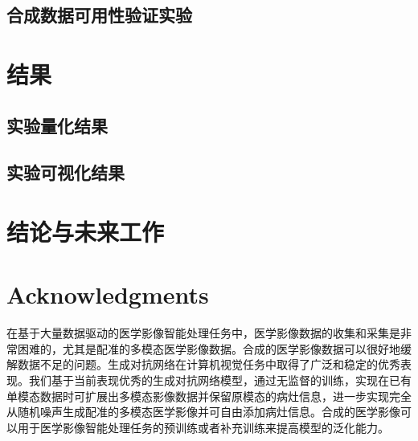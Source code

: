 \documentclass[letterpaper]{article} %
\begin{document}
\subsection{合成数据可用性验证实验}

\section{结果}
\subsection{实验量化结果}
\subsection{实验可视化结果}

\section{结论与未来工作}

\section{ Acknowledgments}
在基于大量数据驱动的医学影像智能处理任务中，医学影像数据的收集和采集是非常困难的，尤其是配准的多模态医学影像数据。合成的医学影像数据可以很好地缓解数据不足的问题。生成对抗网络在计算机视觉任务中取得了广泛和稳定的优秀表现。我们基于当前表现优秀的生成对抗网络模型，通过无监督的训练，实现在已有单模态数据时可扩展出多模态影像数据并保留原模态的病灶信息，进一步实现完全从随机噪声生成配准的多模态医学影像并可自由添加病灶信息。合成的医学影像可以用于医学影像智能处理任务的预训练或者补充训练来提高模型的泛化能力。
\end{document}
